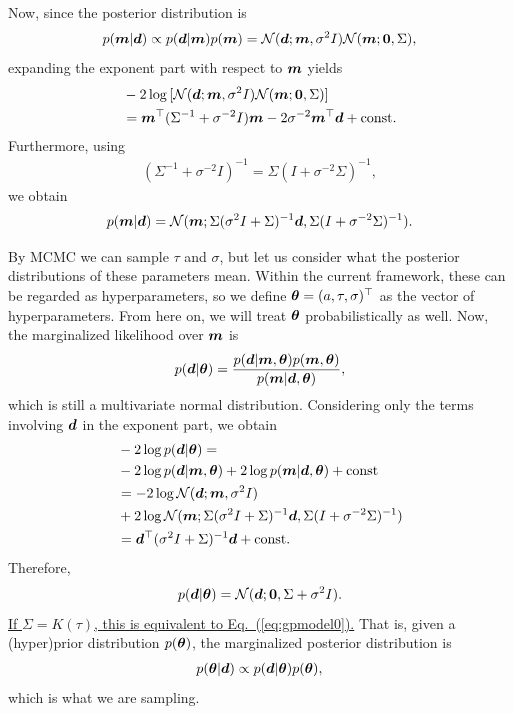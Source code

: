 Now, since the posterior distribution is
\begin{align}
\label{eq:gppos}
p(\boldsymbol{m}|\boldsymbol{d}) \propto p(\boldsymbol{d}|\boldsymbol{m}) p(\boldsymbol{m}) = \mathcal{N} (\boldsymbol{d} ; \boldsymbol{m},\sigma^2 I) \mathcal{N} (\boldsymbol{m};\boldsymbol{0},\Sigma),
\end{align}
expanding the exponent part with respect to $\boldsymbol{m}$ yields
\begin{align}
\label{eq:gpposs}
&- 2 \log{[\mathcal{N}(\boldsymbol{d};\boldsymbol{m},\sigma^2 I) \mathcal{N}(\boldsymbol{m};\boldsymbol{0},\Sigma)]} \nonumber \\
&= \boldsymbol{m}^\top (\Sigma^{-1} + \sigma^{-2} I ) \boldsymbol{m} - 2 \sigma^{-2} \boldsymbol{m}^\top \boldsymbol{d} + \mathrm{const}.
\end{align}
Furthermore, using
\begin{align}
\label{eq:gppossxx}
(\Sigma^{-1} + \sigma^{-2} I )^{-1} = \Sigma (I + \sigma^{-2} \Sigma )^{-1},
\end{align}
we obtain
\begin{align}
\label{eq:gpposss}
p(\boldsymbol{m}|\boldsymbol{d}) = \mathcal{N} (\boldsymbol{m};\Sigma (\sigma^{2} I + \Sigma )^{-1} \boldsymbol{d}, \Sigma (I + \sigma^{-2} \Sigma )^{-1} ).
\end{align}

By MCMC we can sample $\tau$ and $\sigma$, but let us consider what the posterior distributions of these parameters mean. Within the current framework, these can be regarded as hyperparameters, so we define $\boldsymbol{\theta} = (a, \tau, \sigma)^\top$ as the vector of hyperparameters. From here on, we will treat $\boldsymbol{\theta}$ probabilistically as well. Now, the marginalized likelihood over $\boldsymbol{m}$ is
\begin{align}
\label{eq:gppozz}
p(\boldsymbol{d}|\boldsymbol{\theta}) = \frac{p(\boldsymbol{d}|\boldsymbol{m},\boldsymbol{\theta}) p(\boldsymbol{m},\boldsymbol{\theta})}{p(\boldsymbol{m}|\boldsymbol{d},\boldsymbol{\theta})},
\end{align}
which is still a multivariate normal distribution. Considering only the terms involving $\boldsymbol{d}$ in the exponent part, we obtain
\begin{align}
\label{eq:gppozzp}
&- 2 \log p(\boldsymbol{d}|\boldsymbol{\theta}) = \nonumber \\
&- 2 \log p(\boldsymbol{d}|\boldsymbol{m},\boldsymbol{\theta}) + 2 \log p(\boldsymbol{m}|\boldsymbol{d},\boldsymbol{\theta}) + \mathrm{const} \nonumber \\
&= - 2 \log \mathcal{N}(\boldsymbol{d}; \boldsymbol{m}, \sigma^2 I )  \nonumber \\
&+ 2 \log \mathcal{N}(\boldsymbol{m};\Sigma (\sigma^{2} I + \Sigma )^{-1} \boldsymbol{d}, \Sigma (I + \sigma^{-2} \Sigma )^{-1} ) \nonumber \\
&= \boldsymbol{d}^\top (\sigma^{2} I + \Sigma)^{-1} \boldsymbol{d} + \mathrm{const.}
\end{align}
Therefore,
\begin{align}
\label{eq:gmarg}
p(\boldsymbol{d}|\boldsymbol{\theta}) =  \mathcal{N} (\boldsymbol{d};\boldsymbol{0}, \Sigma + \sigma^{2} I ).
\end{align}
\underline{If $\Sigma = K(\tau)$, this is equivalent to Eq.~(\ref{eq:gpmodel0}).}  
That is, given a (hyper)prior distribution $p(\boldsymbol{\theta})$, the marginalized posterior distribution is
\begin{align}
\label{eq:gmpost}
p(\boldsymbol{\theta}|\boldsymbol{d}) \propto p(\boldsymbol{d}|\boldsymbol{\theta}) p(\boldsymbol{\theta}),
\end{align}
which is what we are sampling.

